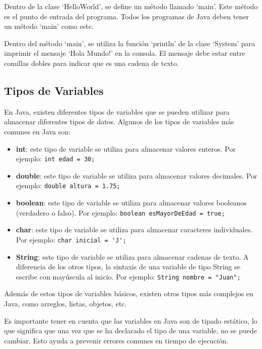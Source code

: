 \documentclass{article}
\begin{document}
    Dentro de la clase \enquote*{HelloWorld}, se define un método llamado \enquote*{main}. Este método es el punto de entrada del programa. Todos los programas de Java deben tener un método \enquote*{main} como este.

    Dentro del método \enquote*{main}, se utiliza la función \enquote*{println} de la clase \enquote*{System} para imprimir el mensaje \enquote*{Hola Mundo!} en la consola. El mensaje debe estar entre comillas dobles para indicar que es una cadena de texto.

\subsection{Tipos de Variables}

En Java, existen diferentes tipos de variables que se pueden utilizar para almacenar diferentes tipos de datos. Algunos de los tipos de variables más comunes en Java son:

\begin{itemize}
\item \textbf{int}: este tipo de variable se utiliza para almacenar valores enteros. Por ejemplo: \lstinline{int edad = 30;}
\item \textbf{double}: este tipo de variable se utiliza para almacenar valores decimales. Por ejemplo: \lstinline{double altura = 1.75;}
\item \textbf{boolean}: este tipo de variable se utiliza para almacenar valores booleanos (verdadero o falso). Por ejemplo: \lstinline{boolean esMayorDeEdad = true;}
\item \textbf{char}: este tipo de variable se utiliza para almacenar caracteres individuales. Por ejemplo: \lstinline{char inicial = 'J';}
\item \textbf{String}: este tipo de variable se utiliza para almacenar cadenas de texto. A diferencia de los otros tipos, la sintaxis de una variable de tipo String se escribe con mayúscula al inicio. Por ejemplo: \lstinline{String nombre = "Juan";}
\end{itemize}

Además de estos tipos de variables básicos, existen otros tipos más complejos en Java, como arreglos, listas, objetos, etc.

Es importante tener en cuenta que las variables en Java son de tipado estático, lo que significa que una vez que se ha declarado el tipo de una variable, no se puede cambiar. Esto ayuda a prevenir errores comunes en tiempo de ejecución.
\end{document}
